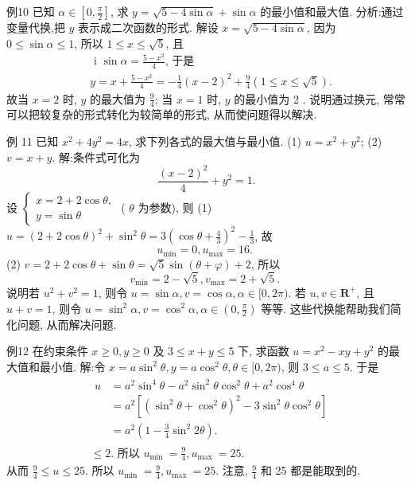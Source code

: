 例10 已知 $\alpha \in\left[0, \frac{\pi}{2}\right]$, 求 $y=\sqrt{5-4 \sin \alpha}+\sin \alpha$ 的最小值和最大值.
分析:通过变量代换,把 $y$ 表示成二次函数的形式.
解设 $x=\sqrt{5-4 \sin \alpha}$, 因为 $0 \leqslant \sin \alpha \leqslant 1$, 所以 $1 \leqslant x \leqslant \sqrt{5}$, 且
$$
\begin{aligned}
& \text { i } \sin \alpha=\frac{5-x^2}{4} \text {, 于是 } \\
& y=x+\frac{5-x^2}{4}=-\frac{1}{4}(x-2)^2+\frac{9}{4}(1 \leqslant x \leqslant \sqrt{5}) .
\end{aligned}
$$
故当 $x=2$ 时, $y$ 的最大值为 $\frac{9}{4}$; 当 $x=1$ 时, $y$ 的最小值为 2 .
说明通过换元, 常常可以把较复杂的形式转化为较简单的形式, 从而使问题得以解决.



例 11 已知 $x^2+4 y^2=4 x$, 求下列各式的最大值与最小值.
(1) $u=x^2+y^2$; (2) $v=x+y$.
解:条件式可化为
$$
\frac{(x-2)^2}{4}+y^2=1 .
$$
设 $\left\{\begin{array}{l}x=2+2 \cos \theta, \\ y=\sin \theta\end{array}\right.$ ( $\theta$ 为参数), 则
(1) $u=(2+2 \cos \theta)^2+\sin ^2 \theta=3\left(\cos \theta+\frac{4}{3}\right)^2-\frac{1}{3}$,
故
$$
u_{\min }=0, u_{\max }=16 \text {. }
$$
(2) $v=2+2 \cos \theta+\sin \theta=\sqrt{5} \sin (\theta+\varphi)+2$,
所以
$$
v_{\min }=2-\sqrt{5}, v_{\max }=2+\sqrt{5} \text {. }
$$
说明若 $u^2+v^2=1$, 则令 $u=\sin \alpha, v=\cos \alpha, \alpha \in[0,2 \pi)$. 若 $u, v \in \mathbf{R}^{+}$, 且 $u+v=1$, 则令 $u=\sin ^2 \alpha, v=\cos ^2 \alpha, \alpha \in\left(0, \frac{\pi}{2}\right)$ 等等.
这些代换能帮助我们简化问题, 从而解决问题.



例12 在约束条件 $x \geqslant 0, y \geqslant 0$ 及 $3 \leqslant x+y \leqslant 5$ 下, 求函数 $u=x^2- x y+y^2$ 的最大值和最小值.
解:令 $x=a \sin ^2 \theta, y=a \cos ^2 \theta, \theta \in[0,2 \pi)$, 则 $3 \leqslant a \leqslant 5$. 于是
$$
\begin{aligned}
& \begin{aligned}
u & =a^2 \sin ^4 \theta-a^2 \sin ^2 \theta \cos ^2 \theta+a^2 \cos ^4 \theta \\
& =a^2\left[\left(\sin ^2 \theta+\cos ^2 \theta\right)^2-3 \sin ^2 \theta \cos ^2 \theta\right] \\
& =a^2\left(1-\frac{3}{4} \sin ^2 2 \theta\right) .
\end{aligned} \\
& \leqslant 2 \text {. 所以 } u_{\text {min }}=\frac{9}{4}, u_{\text {max }}=25 .
\end{aligned}
$$
从而 $\frac{9}{4} \leqslant u \leqslant 25$. 所以 $u_{\text {min }}=\frac{9}{4}, u_{\text {max }}=25$.
注意, $\frac{9}{4}$ 和 25 都是能取到的.



